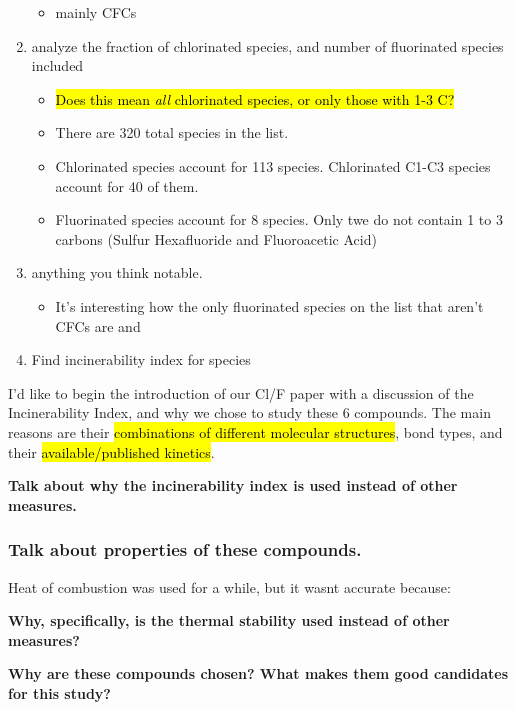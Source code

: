\documentclass{article}
\begin{document}
\begin{enumerate}
    \begin{itemize}
        \item mainly CFCs
    \end{itemize}
    \item analyze the fraction of chlorinated species, and number of fluorinated species included
    \begin{itemize}
        \item \hl{Does this mean \emph{all} chlorinated species, or only those with 1-3 C?}
        \item There are 320 total species in the list. 
        \item Chlorinated species account for 113 species. Chlorinated C1-C3 species account for 40 of them.
        \item Fluorinated species account for 8 species. Only twe do not contain 1 to 3 carbons (Sulfur Hexafluoride and Fluoroacetic Acid)
    \end{itemize}
    \item anything you think notable.
    \begin{itemize}
        \item It's interesting how the only fluorinated species on the list that aren't CFCs are  and 
    \end{itemize}
    \item Find incinerability index for species %
\end{enumerate}
 
I’d like to begin the introduction of our Cl/F paper with a discussion of the Incinerability Index, and why we chose to study these 6 compounds. The main reasons are their \hl{combinations of different molecular structures}, bond types, and their \hl{available/published kinetics}. %

\textbf{Talk about why the incinerability index is used instead of other measures.}

\subsubsection*{Talk about properties of these compounds.} 

Heat of combustion was used for a while, but it wasnt accurate because: 

\textbf{Why, specifically, is the thermal stability used instead of other measures?}

\textbf{Why are these compounds chosen? What makes them good candidates for this study?}
\end{document}

